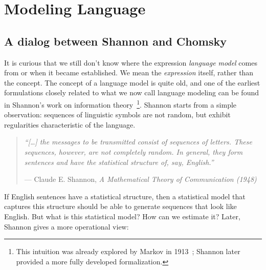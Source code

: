\chapter{Modeling Language}\label{ch:introduction}
\section{A dialog between Shannon and Chomsky}
It is curious that we still don't know where the expression \textit{language model} comes from or when it became established.
We mean the \textit{expression} itself, rather than the concept.
The concept of a language model is quite old, and one of the earliest
formulations closely related to what we now call language modeling can be found in Shannon's 
work on information theory~\citep{shannon1948mathematical}\footnote{
    This intuition was already explored by Markov in 1913~\citep{1913_lm};
    Shannon later provided a more fully developed formalization.
}. 
Shannon starts from a simple observation: sequences of linguistic symbols are not random, 
but exhibit regularities characteristic of the language.
\begin{quote}
    \small\itshape
    ``[\ldots{}] the messages to be transmitted consist of sequences of letters. 
    These sequences, however, are not completely random. 
    In general, they form sentences and have the statistical structure of, say, English.''

    \begin{flushright}
    \normalfont--- Claude E. Shannon, \textit{A Mathematical Theory of Communication (1948)}
    \end{flushright}
\end{quote}
If English sentences have a statistical structure, then a statistical model that 
captures this structure should be able to generate sequences that look like English.
But what is this statistical model? How can we estimate it? Later, Shannon gives a more operational view:

